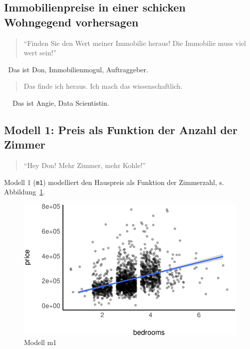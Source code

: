 \documentclass[
  a4paper,
  DIV=11]{scrreprt}
\theoremstyle{definition}
\theoremstyle{remark}
\begin{document}
\hypertarget{immobilienpreise-in-einer-schicken-wohngegend-vorhersagen}{%
\subsection{Immobilienpreise in einer schicken Wohngegend
vorhersagen}\label{immobilienpreise-in-einer-schicken-wohngegend-vorhersagen}}

\begin{quote}
``Finden Sie den Wert meiner Immobilie heraus! Die Immobilie muss viel
wert sein!''
\end{quote}

🧑 Das ist Don, Immobilienmogul, Auftraggeber.

\begin{quote}
Das finde ich heraus. Ich mach das wissenschaftlich.
\end{quote}

👩 🔬 Das ist Angie, Data Scientistin.

\hypertarget{modell-1-preis-als-funktion-der-anzahl-der-zimmer}{%
\subsection{Modell 1: Preis als Funktion der Anzahl der
Zimmer}\label{modell-1-preis-als-funktion-der-anzahl-der-zimmer}}

\begin{quote}
``Hey Don! Mehr Zimmer, mehr Kohle!'' 👩 🔬
\end{quote}

Modell 1 (\texttt{m1}) modelliert den Hauspreis als Funktion der
Zimmerzahl, s. Abbildung~\ref{fig-m1}.

\begin{figure}

{\centering \includegraphics{./kausal_files/figure-pdf/fig-m1-1.pdf}

}

\caption{\label{fig-m1}Modell m1}

\end{figure}
\end{document}
